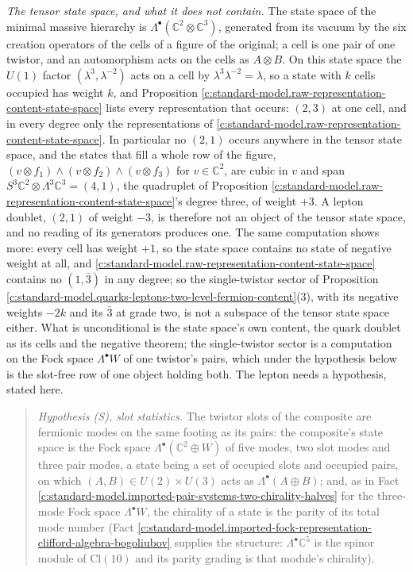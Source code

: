 \documentclass[11pt]{article}
\theoremstyle{definition}
\theoremstyle{plain}
\providecommand{\C}{}\renewcommand{\C}{\mathbb{C}}
\providecommand{\Cl}{}\renewcommand{\Cl}{\mathrm{Cl}}
\begin{document}
\emph{The tensor state space, and what it does not contain.} The state space of the minimal massive hierarchy is $\Lambda^{\bullet}(\C^{2} \otimes \C^{3})$, generated from its vacuum by the six creation operators of the cells of a figure of the original; a cell is one pair of one twistor, and an automorphism acts on the cells as $A \otimes B$. On this state space the $U(1)$ factor $(\lambda^{3}, \lambda^{-2})$ acts on a cell by $\lambda^{3}\lambda^{-2} = \lambda$, so a state with $k$ cells occupied has weight $k$, and Proposition \ref{c:standard-model.raw-representation-content-state-space} lists every representation that occurs: $(2,3)$ at one cell, and in every degree only the representations of \ref{c:standard-model.raw-representation-content-state-space}. In particular no $(2,1)$ occurs anywhere in the tensor state space, and the states that fill a whole row of the figure, $(v \otimes f_{1}) \wedge (v \otimes f_{2}) \wedge (v \otimes f_{3})$ for $v \in \C^{2}$, are cubic in $v$ and span $S^{3}\C^{2} \otimes \Lambda^{3}\C^{3} = (4, 1)$, the quadruplet of Proposition \ref{c:standard-model.raw-representation-content-state-space}'s degree three, of weight $+3$. A lepton doublet, $(2,1)$ of weight $-3$, is therefore not an object of the tensor state space, and no reading of its generators produces one. The same computation shows more: every cell has weight $+1$, so the state space contains no state of negative weight at all, and \ref{c:standard-model.raw-representation-content-state-space} contains no $(1, \bar{3})$ in any degree; so the single-twistor sector of Proposition \ref{c:standard-model.quarks-leptons-two-level-fermion-content}(3), with its negative weights $-2k$ and its $\bar{3}$ at grade two, is not a subspace of the tensor state space either. What is unconditional is the state space's own content, the quark doublet as its cells and the negative theorem; the single-twistor sector is a computation on the Fock space $\Lambda^{\bullet}W$ of one twistor's pairs, which under the hypothesis below is the slot-free row of one object holding both. The lepton needs a hypothesis, stated here.

\begin{quote}
\emph{Hypothesis (S), slot statistics.} The twistor slots of the composite are fermionic modes on the same footing as its pairs: the composite's state space is the Fock space $\Lambda^{\bullet}(\C^{2} \oplus W)$ of five modes, two slot modes and three pair modes, a state being a set of occupied slots and occupied pairs, on which $(A, B) \in U(2) \times U(3)$ acts as $\Lambda^{\bullet}(A \oplus B)$; and, as in Fact \ref{c:standard-model.imported-pair-systems-two-chirality-halves} for the three-mode Fock space $\Lambda^{\bullet}W$, the chirality of a state is the parity of its total mode number (Fact \ref{c:standard-model.imported-fock-representation-clifford-algebra-bogoliubov} supplies the structure: $\Lambda^{\bullet}\C^{5}$ is the spinor module of $\Cl(10)$ and its parity grading is that module's chirality).
\end{quote}
\end{document}
